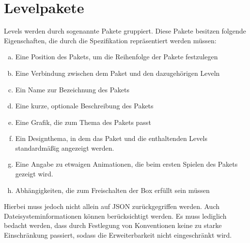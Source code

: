 \section{Levelpakete}
Levels werden durch sogenannte Pakete gruppiert.
Diese Pakete besitzen folgende Eigenschaften, die durch die Spezifikation repräsentiert werden müssen:
\begin{enumerate}[a)]
	\item Eine Position des Pakets, um die Reihenfolge der Pakete festzulegen
	\item Eine Verbindung zwischen dem Paket und den dazugehörigen Leveln
	\item Ein Name zur Bezeichnung des Pakets
	\item Eine kurze, optionale Beschreibung des Pakets
	\item Eine Grafik, die zum Thema des Pakets passt
	\item Ein Designthema, in dem das Paket und die enthaltenden Levels standardmäßig angezeigt werden.
	\item Eine Angabe zu etwaigen Animationen, die beim ersten Spielen des Pakets gezeigt wird.
	\item Abhängigkeiten, die zum Freischalten der Box erfüllt sein müssen
\end{enumerate}
Hierbei muss jedoch nicht allein auf JSON zurückgegriffen werden.
Auch Dateisysteminformationen können berücksichtigt werden.
Es muss lediglich bedacht werden, dass durch Festlegung von Konventionen keine zu starke Einschränkung passiert, sodass die Erweiterbarkeit nicht eingeschränkt wird.

